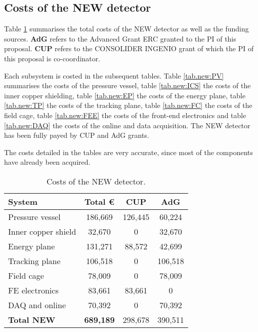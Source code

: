 \subsection{Costs of the NEW detector}
Table \ref{tab.new:DET} summarises the total costs of the NEW detector as well as the funding sources. {\bf AdG} refers to the Advanced Grant ERC granted to the PI of this proposal. {\bf CUP} refers to the CONSOLIDER INGENIO grant of which the PI of this proposal is co-coordinator.

Each subsystem is costed in the subsequent tables. Table \ref{tab.new:PV} summarises the costs of the pressure vessel, 
table \ref{tab.new:ICS} the costs of the inner copper shielding,
table \ref{tab.new:EP} the costs of the energy plane,
table \ref{tab.new:TP} the costs of the tracking plane,
table \ref{tab.new:FC} the costs of the field cage,
table \ref{tab.new:FEE} the costs of the front-end electronics and
table \ref{tab.new:DAQ} the costs of the online and data acquisition. The NEW detector has
been fully payed by CUP and AdG grants.

The costs detailed in the tables are very accurate, since most of the components have already been acquired. 
  
\begin{table}[h!]
\begin{center}
\begin{tabular}{|l|c|c|c|}
\hline
 System & Total \euro & CUP & AdG  \\
 \hline
 Pressure vessel 	& 186,669 &	126,445 &	60,224 \\
Inner copper shield	& 32,670	& 0 &	32,670 \\
Energy plane	& 131,271 &	88,572 &	42,699 \\
Tracking plane	& 106,518 &	0 &	106,518  \\
Field cage	& 78,009 &	0 &	78,009 \\
FE electronics &	83,661 &	83,661 &	0\\
DAQ and online &	70,392 &	0 &	70,392 \\
 \hline
{\bf Total NEW} &	{\bf 689,189 }& 	298,678 & 	390,511 \\	
 \hline\hline
\end{tabular}  
\caption{Costs of the NEW detector.}
\label{tab.new:DET}
\end{center}
\end{table} 

